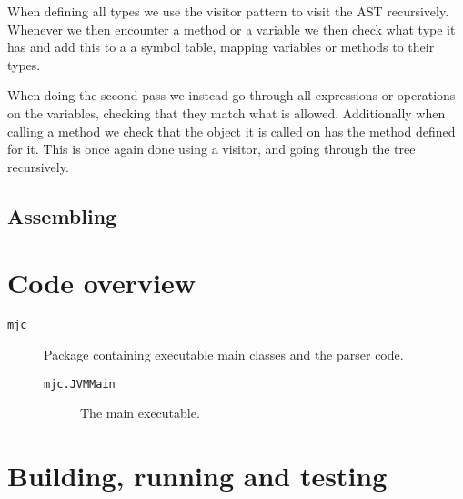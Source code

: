 \documentclass[a4paper]{article}
\begin{document}
When defining all types we use the visitor pattern to visit the AST recursively. Whenever we then encounter a method or a variable we then check what type it has and add this to a a symbol table, mapping variables or methods to their types.

When doing the second pass we instead go through all expressions or operations on the variables, checking that they match what is allowed. Additionally when calling a method we check that the object it is called on has the method defined for it. This is once again done using a visitor, and going through the tree recursively.

\subsection{Assembling}


\section{Code overview}

\begin{description}
\item[\texttt{mjc}] Package containing executable main classes and the parser
    code.
    \begin{description}
        \item[\texttt{mjc.JVMMain}] The main executable.
    \end{description}
\end{description}

\section{Building, running and testing}
\end{document}
